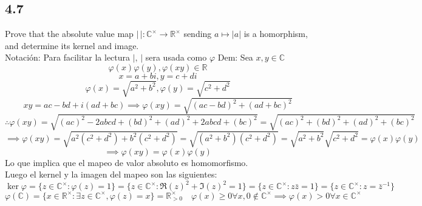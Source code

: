 \documentclass[11pt]{article}
\begin{document}
\subsection*{4.7}
Prove that the absolute value map $|\,|:\mathbb{C}^\times\rightarrow\mathbb{R}^\times$ sending $a\mapsto |a|$ is a homorphism, and determine its kernel and image.\\
Notación: Para facilitar la lectura $|,\,|$ sera usada como $\varphi$
Dem: Sea $x,y\in\mathbb{C}$
\[
\varphi(x)\varphi(y),\varphi(xy)\in\mathbb{R}
\]
\[
x=a+bi,y=c+di
\]
\[
\varphi(x)=\sqrt{a^2+b^2},\varphi(y)=\sqrt{c^2+d^2}
\]
\[
xy=ac-bd+i(ad+bc)\implies \varphi(xy)=\sqrt{(ac-bd)^2+(ad+bc)^2}
\]
\[
\therefore \varphi(xy)=\sqrt{(ac)^2-2abcd+(bd)^2+(ad)^2+2abcd+(bc)^2}=\sqrt{(ac)^2+(bd)^2+(ad)^2+(bc)^2}
\]
\[
\implies \varphi(xy)=\sqrt{a^2(c^2+d^2)+b^2(c^2+d^2)}=\sqrt{(a^2+b^2)(c^2+d^2)}=\sqrt{a^2+b^2}\sqrt{c^2+d^2}=\varphi(x)\varphi(y)
\]
\[
\implies \varphi(xy)=\varphi(x)\varphi(y)
\]
Lo que implica que el mapeo de valor absoluto es homomorfismo.\\
Luego el kernel y la imagen del mapeo son las siguientes:
\[
\ker \varphi=\{z\in\mathbb{C}^\times:\varphi(z)=1\}=\{z\in\mathbb{C}^\times:\Re(z)^2+\Im(z)^2=1\}=\{z\in\mathbb{C}^\times:z\bar{z}=1\}=\{z\in\mathbb{C}^\times:z=\bar{z}^{-1}\}
\]
\[
 \varphi(\mathbb{C})=\{x\in\mathbb{R}^\times:\exists z\in\mathbb{C}^\times,\varphi(z)=x\}=\mathbb{R}^\times_{>0}\quad\varphi(x)\geq 0\forall x,0\notin\mathbb{C}^\times\implies\varphi(x)>0\forall x\in\mathbb{C}^\times
\]
\end{document}
